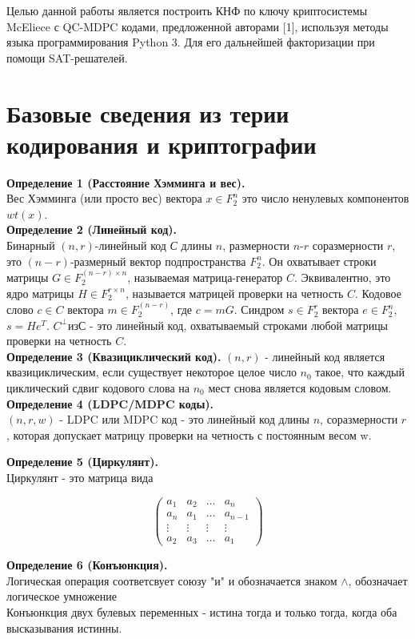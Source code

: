 \documentclass[12pt]{article}
\begin{document}
Целью данной работы является построить КНФ по ключу криптосистемы McEliece с QC-MDPC кодами, предложенной авторами [1], используя методы языка программирования Python 3. Для его дальнейшей факторизации при помощи SAT-решателей.  

\newpage

\section{Базовые сведения из терии кодирования и криптографии}
\normalsize
\textbf{Определение 1 (Расстояние Хэмминга и вес).}\\ Вес Хэмминга (или просто вес) вектора $x \in F_{2}^{n}$ это число ненулевых компонентов $wt(x)$.\\

\textbf{Определение 2 (Линейный код).}\\ Бинарный $(n,r)$-линейный код \textit{С} длины $\textit{n}$, размерности $\textit{n-r}$ соразмерности $r$, это $(n - r)$-размерный вектор подпространства $F_{2}^{n}$. Он охватывает строки матрицы $G \in F_{2}^{(n-r)\times n}$, называемая матрица-генератор $C$. Эквивалентно, это ядро матрицы $H \in F_{2}^{r\times n}$, называется матрицей проверки на четность $C$. Кодовое слово $c \in C$ вектора $m \in F_{2}^{(n-r)}$, где $c = mG$. Синдром $s \in F^{r}_{2}$ вектора $e \in F^{n}_{2}$, $s = He^{T}$. $C^{\perp} из С$ - это линейный код, охватываемый строками любой матрицы проверки на четность $C$.\\

\textbf{Определение 3 (Квазициклический код).} $(n,r)$ - линейный код является \sloppy квазициклическим, если существует некоторое целое число $n_{0}$ такое, что каждый циклический сдвиг кодового слова на $n_{0}$ мест снова является кодовым словом.  \\

\textbf{Определение 4 (LDPC/MDPC коды).}\\
$(n,r,w)$ - LDPC или MDPC код - это линейный код длины $n$, соразмерности $r$, которая допускает матрицу проверки на четность с постоянным весом w.

\textbf{Определение 5 (Циркулянт).}\\
Циркулянт - это матрица вида 
\begin{center}
\[ \begin{pmatrix}
a_{1} & a_{2} & \dots & a_{n} \\
a_{n} & a_{1} & \dots & a_{n - 1} \\
\vdots & \vdots & \vdots & \vdots \\
a_{2} & a_{3} & \dots & a_{1}
\end{pmatrix}
\]
\end{center}
\newpage
\textbf{Определение 6 (Конъюнкция).}\\
Логическая операция соответсвует союзу "и" и обозначается знаком $\wedge$, обозначает логическое умножение
\\
Конъюнкция двух булевых переменных - истина тогда и только тогда, когда оба высказывания истинны.
\end{document}
